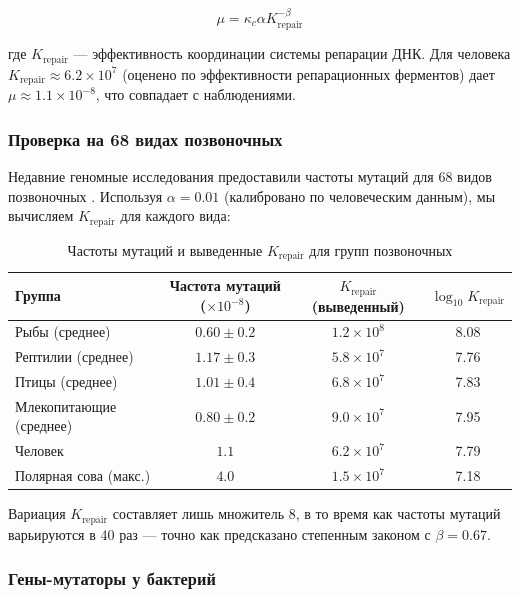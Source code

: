 \documentclass[12pt,a4paper]{article}
\theoremstyle{remark}
\newcommand{\kappac}{\kappa_c}
\begin{document}
	\begin{equation}
		\mu = \kappac \alpha K_{\text{repair}}^{-\beta}
		\label{eq:mutation-rate}
	\end{equation}
	
	где $K_{\text{repair}}$ — эффективность координации системы репарации ДНК. Для человека $K_{\text{repair}} \approx 6.2 \times 10^7$ (оценено по эффективности репарационных ферментов) дает $\mu \approx 1.1 \times 10^{-8}$, что совпадает с наблюдениями.
	
	\subsubsection{Проверка на 68 видах позвоночных}
	
	Недавние геномные исследования предоставили частоты мутаций для 68 видов позвоночных \cite{Bergeron2023}. Используя $\alpha = 0.01$ (калибровано по человеческим данным), мы вычисляем $K_{\text{repair}}$ для каждого вида:
	
	\begin{table}[htbp]
		\centering
		\caption{Частоты мутаций и выведенные $K_{\text{repair}}$ для групп позвоночных \cite{Bergeron2023}}
		\label{tab:vertebrate-mutations}
		\small
		\begin{tabular}{lccc}
			\toprule
			\textbf{Группа} & \textbf{Частота мутаций ($\times 10^{-8}$)} & \textbf{$K_{\text{repair}}$ (выведенный)} & $\log_{10} K_{\text{repair}}$ \\
			\midrule
			Рыбы (среднее) & $0.60 \pm 0.2$ & $1.2 \times 10^8$ & 8.08 \\
			Рептилии (среднее) & $1.17 \pm 0.3$ & $5.8 \times 10^7$ & 7.76 \\
			Птицы (среднее) & $1.01 \pm 0.4$ & $6.8 \times 10^7$ & 7.83 \\
			Млекопитающие (среднее) & $0.80 \pm 0.2$ & $9.0 \times 10^7$ & 7.95 \\
			Человек & $1.1$ & $6.2 \times 10^7$ & 7.79 \\
			Полярная сова (макс.) & $4.0$ & $1.5 \times 10^7$ & 7.18 \\
			\bottomrule
		\end{tabular}
	\end{table}
	
	Вариация $K_{\text{repair}}$ составляет лишь множитель 8, в то время как частоты мутаций варьируются в 40 раз — точно как предсказано степенным законом с $\beta = 0.67$.
	
	\subsubsection{Гены-мутаторы у бактерий}
	
\end{document}
